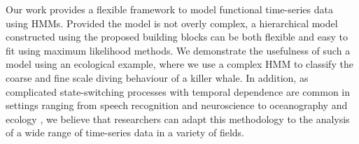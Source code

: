 


Our work provides a flexible framework to model functional time-series data using HMMs. Provided the model is not overly complex, a hierarchical model constructed using the proposed building blocks can be both flexible and easy to fit using maximum likelihood methods. We demonstrate the usefulness of such a model using an ecological example, where we use a complex HMM to classify the coarse and fine scale diving behaviour of a killer whale. In addition, as complicated state-switching processes with temporal dependence are common in settings ranging from speech recognition \citep{Juang:1991} and neuroscience \citep{Langrock:2013} to oceanography \citep{Bulla:2012} and ecology \citep{Adam:2019}, we believe that researchers can adapt this methodology to the analysis of a wide range of time-series data in a variety of fields.